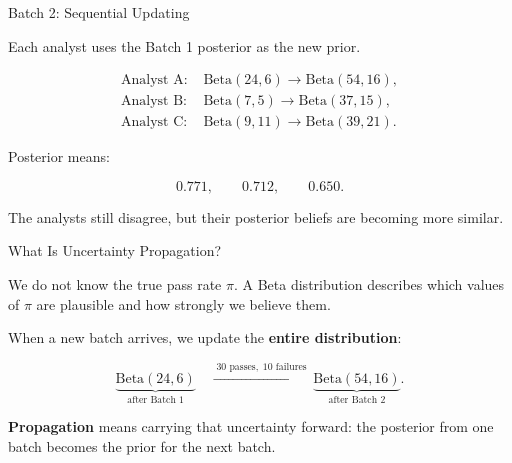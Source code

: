\documentclass[aspectratio=43]{beamer}
\begin{document}
\begin{frame}{Batch 2: Sequential Updating}

Each analyst uses the Batch 1 posterior as the new prior.

\vspace{0.25cm}

\begin{align*}
\text{Analyst A: }&
\mathrm{Beta}(24,6)
\longrightarrow
\mathrm{Beta}(54,16),
\\[0.15cm]
\text{Analyst B: }&
\mathrm{Beta}(7,5)
\longrightarrow
\mathrm{Beta}(37,15),
\\[0.15cm]
\text{Analyst C: }&
\mathrm{Beta}(9,11)
\longrightarrow
\mathrm{Beta}(39,21).
\end{align*}

\vspace{0.25cm}

Posterior means:

\[
0.771,
\qquad
0.712,
\qquad
0.650.
\]

\vspace{0.2cm}

The analysts still disagree, but their posterior beliefs
are becoming more similar.

\end{frame}

\begin{frame}{What Is Uncertainty Propagation?}

We do not know the true pass rate $\pi$. A Beta distribution describes
which values of $\pi$ are plausible and how strongly we believe them.

\vspace{0.4cm}

When a new batch arrives, we update the \textbf{entire distribution}:

\[
\underbrace{\mathrm{Beta}(24,6)}_{\text{after Batch 1}}
\quad\xrightarrow{\;30\text{ passes},\;10\text{ failures}\;}
\underbrace{\mathrm{Beta}(54,16)}_{\text{after Batch 2}}.
\]

\vspace{0.25cm}

\textbf{Propagation} means carrying that uncertainty forward: the
posterior from one batch becomes the prior for the next batch.

\end{frame}
\end{document}
